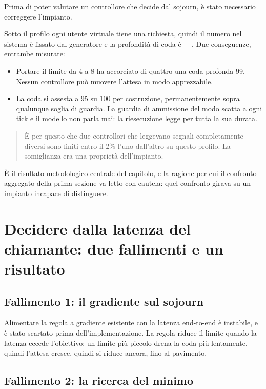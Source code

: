 Prima di poter valutare un controllore che decide dal sojourn, \`e stato
necessario correggere l'impianto.

Sotto il profilo  ogni utente virtuale tiene una richiesta, quindi
il numero nel sistema \`e fissato dal generatore e la profondit\`a di coda \`e
 $-$ . Due conseguenze, entrambe misurate:

\begin{itemize}[leftmargin=*]
  \item Portare il limite da 4 a 8 ha accorciato di quattro una coda profonda 99.
  Nessun controllore pu\`o muovere l'attesa in modo apprezzabile.
  \item La coda si assesta a 95 su 100 per costruzione, permanentemente sopra
  qualunque soglia di guardia. La guardia di ammissione del modo 
  scatta a ogni tick e il modello non parla mai: la riesecuzione legge
   per tutta la sua durata.
\end{itemize}

\begin{quote}
\`E per questo che due controllori che leggevano segnali completamente diversi
sono finiti entro il 2\% l'uno dall'altro su questo profilo. La somiglianza era
una propriet\`a dell'impianto.
\end{quote}

\`E il risultato metodologico centrale del capitolo, e la ragione per cui il
confronto aggregato della prima sezione va letto con cautela: quel confronto
girava su un impianto incapace di distinguere.

\section{Decidere dalla latenza del chiamante: due fallimenti e un risultato}

\subsection{Fallimento 1: il gradiente sul sojourn}

Alimentare la regola a gradiente esistente con la latenza end-to-end \`e
instabile, e \`e stato scartato prima dell'implementazione. La regola riduce il
limite quando la latenza eccede l'obiettivo; un limite pi\`u piccolo drena la
coda pi\`u lentamente, quindi l'attesa cresce, quindi si riduce ancora, fino al
pavimento.

\subsection{Fallimento 2: la ricerca del minimo}


